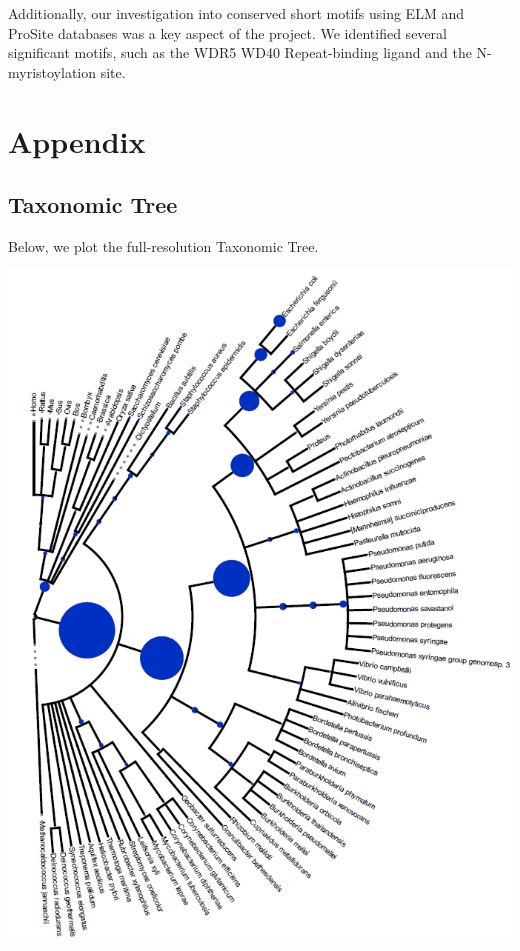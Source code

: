 \documentclass[10pt,twocolumn,letterpaper]{article}
\begin{document}
Additionally, our investigation into conserved short motifs using ELM and ProSite databases was a key aspect of the project. We identified several significant motifs, such as the WDR5 WD40 Repeat-binding ligand and the N-myristoylation site.



{\small


}

\clearpage %
\onecolumn %

\section{Appendix}


\subsection{Taxonomic Tree}
\label{sec:taxtree}

Below, we plot the full-resolution Taxonomic Tree. \\
\begin{center}
    \includegraphics[]{report/img/taxonomy_tree.png}
\end{center}
\end{document}
